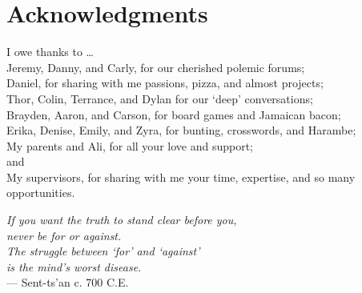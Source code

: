 \section*{Acknowledgments}
I owe thanks to \dots
\\Jeremy, Danny, and Carly, for our cherished polemic forums;
\\Daniel, for sharing with me passions, pizza, and almost projects;
\\Thor, Colin, Terrance, and Dylan for our `deep' conversations;
\\Brayden, Aaron, and Carson, for board games and Jamaican bacon;
\\Erika, Denise, Emily, and Zyra, for bunting, crosswords, and Harambe;
\\My parents and Ali, for all your love and support;
\\and
\\My supervisors, for sharing with me your time, expertise, and so many opportunities.
\vfill
\begin{singlespace}
  \hspace*{4.0cm}\textit{If you want the truth to stand clear before you,}\\
  \hspace*{4.5cm}\textit{never be for or against.}                        \\
  \hspace*{4.0cm}\textit{The struggle between `for' and `against'}        \\
  \hspace*{4.5cm}\textit{is the mind's worst disease.}                    \\[0.5em]
  \hspace*{9.0cm}\normalfont{} --- Sent-ts'an c. 700 C.E.
\end{singlespace}
